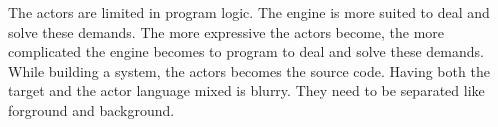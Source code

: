 The actors are limited in program logic. The engine is more suited to
deal and solve these demands. The more expressive the actors become, the
more complicated the engine becomes to program to deal and solve these
demands. While building a system, the actors becomes the source code.
Having both the target and the actor language mixed is blurry. They need
to be separated like forground and background.
